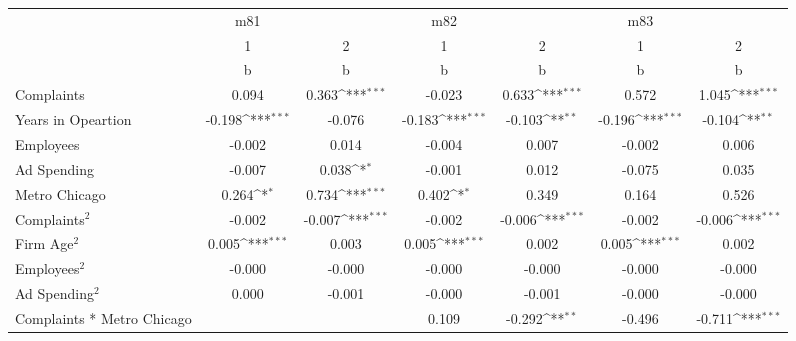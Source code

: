 {
\def\sym#1{\ifmmode^{#1}\else\(^{#1}\)\fi}
\begin{tabular}{l*{6}{c}}
\toprule
                    &         m81         &                     &         m82         &                     &         m83         &                     \\
                    &           1         &           2         &           1         &           2         &           1         &           2         \\
                    &           b         &           b         &           b         &           b         &           b         &           b         \\
\midrule
Complaints          &       0.094         &       0.363\sym{***}&      -0.023         &       0.633\sym{***}&       0.572         &       1.045\sym{***}\\
Years in Opeartion  &      -0.198\sym{***}&      -0.076         &      -0.183\sym{***}&      -0.103\sym{**} &      -0.196\sym{***}&      -0.104\sym{**} \\
Employees           &      -0.002         &       0.014         &      -0.004         &       0.007         &      -0.002         &       0.006         \\
Ad Spending         &      -0.007         &       0.038\sym{*}  &      -0.001         &       0.012         &      -0.075         &       0.035         \\
Metro Chicago       &       0.264\sym{*}  &       0.734\sym{***}&       0.402\sym{*}  &       0.349         &       0.164         &       0.526         \\
Complaints$^{2}$    &      -0.002         &      -0.007\sym{***}&      -0.002         &      -0.006\sym{***}&      -0.002         &      -0.006\sym{***}\\
Firm Age$^{2}$      &       0.005\sym{***}&       0.003         &       0.005\sym{***}&       0.002         &       0.005\sym{***}&       0.002         \\
Employees$^{2}$     &      -0.000         &      -0.000         &      -0.000         &      -0.000         &      -0.000         &      -0.000         \\
Ad Spending$^{2}$   &       0.000         &      -0.001         &      -0.000         &      -0.001         &      -0.000         &      -0.000         \\
Complaints * Metro Chicago&                     &                     &       0.109         &      -0.292\sym{**} &      -0.496         &      -0.711\sym{***}\\

\end{tabular}}
